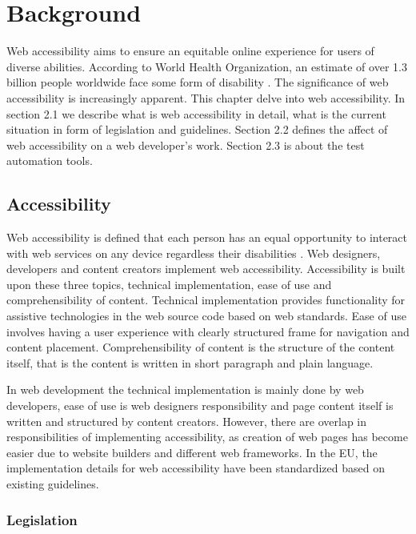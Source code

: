 \chapter{Background\label{background}}

Web accessibility aims to ensure an equitable online experience for users of diverse abilities. According to World Health Organization, an estimate of over 1.3 billion people worldwide face some form of disability \citep{whodisability}. The significance of web accessibility is increasingly apparent. This chapter delve into web accessibility. In section 2.1 we describe what is web accessibility in detail, what is the current situation in form of legislation and guidelines. Section 2.2 defines the affect of web accessibility on a web developer's work. Section 2.3 is about the test automation tools.

\section{Accessibility}

Web accessibility is defined that each person has an equal opportunity to interact with web services on any device regardless their disabilities \citep{webaccessibilitydefinition}. Web designers, developers and content creators implement web accessibility. Accessibility is built upon these three topics, technical implementation, ease of use and comprehensibility of content. Technical implementation provides functionality for assistive technologies in the web source code based on web standards. Ease of use involves having a user experience with clearly structured frame for navigation and content placement. Comprehensibility of content is the structure of the content itself, that is the content is written in short paragraph and plain language. 

In web development the technical implementation is mainly done by web developers, ease of use is web designers responsibility and page content itself is written and structured by content creators. However, there are overlap in responsibilities of implementing accessibility, as creation of web pages has become easier due to website builders and different web frameworks. In the EU, the implementation details for web accessibility have been standardized based on existing guidelines.

\subsection{Legislation}

